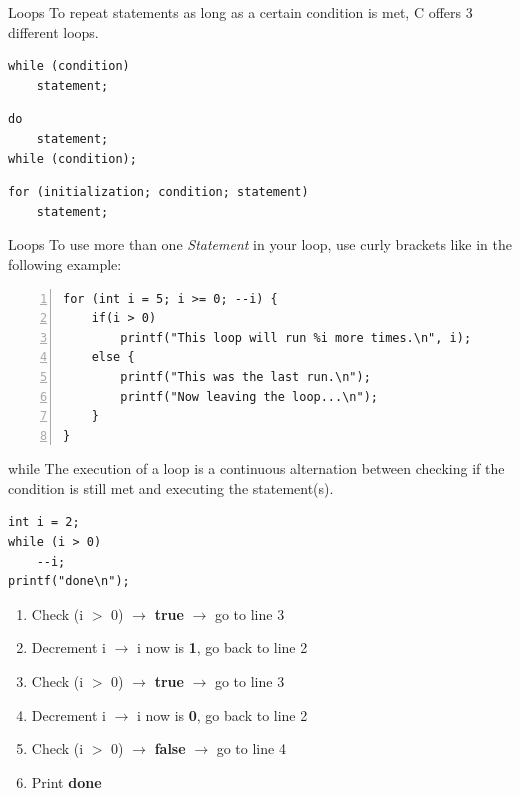 \begin{frame}[fragile]{Loops}
	To repeat statements as long as a certain condition is met, C offers 3 different loops.
	\begin{lstlisting}[numbers=none,basicstyle=\itshape\footnotesize]
while (condition)
    statement;
    \end{lstlisting}
	\begin{lstlisting}[numbers=none,basicstyle=\itshape\footnotesize]
do
    statement;
while (condition);
    \end{lstlisting}
	\begin{lstlisting}[numbers=none,basicstyle=\itshape\footnotesize]
for (initialization; condition; statement)
    statement;
    \end{lstlisting}
\end{frame}

\begin{frame}[fragile]{Loops}
	To use more than one \textit{Statement} in your loop, use curly brackets like in the following example:
	\begin{lstlisting}[numbers=left]
for (int i = 5; i >= 0; --i) {
    if(i > 0)
        printf("This loop will run %i more times.\n", i);
    else {
        printf("This was the last run.\n");
        printf("Now leaving the loop...\n");
    }
}
    \end{lstlisting}
    
\end{frame}

\begin{frame}[fragile]{while}
	The execution of a loop is a continuous alternation between checking if the condition is still met and executing the statement(s).
	\begin{lstlisting}
int i = 2;
while (i > 0)
	--i;
printf("done\n");
\end{lstlisting}
	\begin{enumerate}[<+(1)->]
		\item Check (i $>$ 0) $\rightarrow$ \textbf{true} $\rightarrow$ go to line 3
		\item Decrement i $\rightarrow$ i now is \textbf{1}, go back to line 2
		\item Check (i $>$ 0) $\rightarrow$ \textbf{true} $\rightarrow$ go to line 3
		\item Decrement i $\rightarrow$ i now is \textbf{0}, go back to line 2
		\item Check (i $>$ 0) $\rightarrow$ \textbf{false} $\rightarrow$ go to line 4
		\item Print \textbf{done}
	\end{enumerate}
\end{frame}


